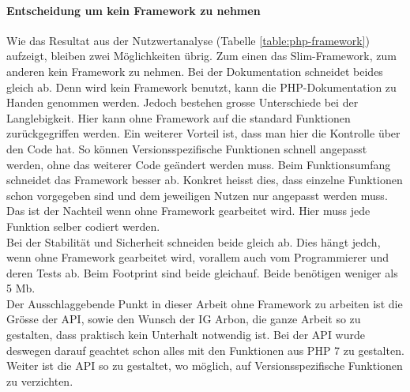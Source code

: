 \paragraph*{Entscheidung um kein Framework zu nehmen}
Wie das Resultat aus der Nutzwertanalyse (Tabelle \ref{table:php-framework}) aufzeigt, bleiben zwei Möglichkeiten übrig. Zum einen das Slim-Framework, zum anderen kein Framework zu nehmen. Bei der Dokumentation schneidet beides gleich ab. Denn wird kein Framework benutzt, kann die PHP-Dokumentation zu Handen genommen werden. Jedoch bestehen grosse Unterschiede bei der Langlebigkeit. Hier kann ohne Framework auf die standard Funktionen zurückgegriffen werden. Ein weiterer Vorteil ist, dass man hier die Kontrolle über den Code hat. So können Versionsspezifische Funktionen schnell angepasst werden, ohne das weiterer Code geändert werden muss. Beim Funktionsumfang schneidet das Framework besser ab. Konkret heisst dies, dass einzelne Funktionen schon vorgegeben sind und dem jeweiligen Nutzen nur angepasst werden muss. Das ist der Nachteil wenn ohne Framework gearbeitet wird. Hier muss jede Funktion selber codiert werden.\\
Bei der Stabilität und Sicherheit schneiden beide gleich ab. Dies hängt jedch, wenn ohne Framework gearbeitet wird, vorallem auch vom Programmierer und deren Tests ab. Beim Footprint sind beide gleichauf. Beide benötigen weniger als 5 Mb.\\
Der Ausschlaggebende Punkt in dieser Arbeit ohne Framework zu arbeiten ist die Grösse der API, sowie den Wunsch der IG Arbon, die ganze Arbeit so zu gestalten, dass praktisch kein Unterhalt notwendig ist. Bei der API wurde deswegen darauf geachtet schon alles mit den Funktionen aus PHP 7 zu gestalten. Weiter ist die API so zu gestaltet, wo möglich, auf Versionsspezifische Funktionen zu verzichten. 



